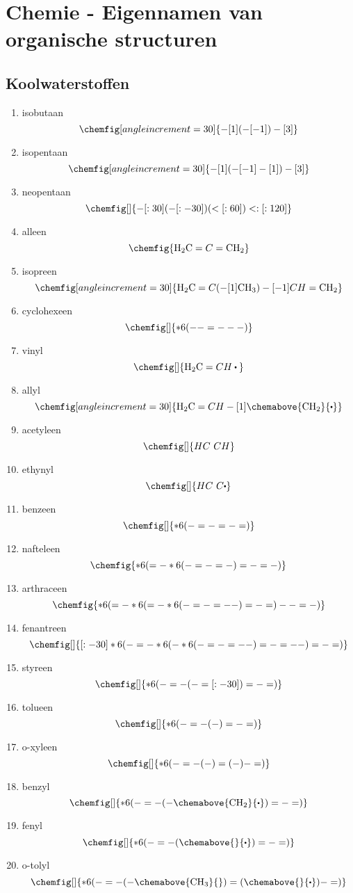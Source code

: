 \documentclass[a4paper,12pt]{article}
\begin{document}
    \maketitle

    \section{Chemie - Eigennamen van organische structuren}

    \subsection{Koolwaterstoffen}
    \begin{enumerate}
        \item isobutaan $$\chemfig[angle increment=30]{-[1](-[-1])-[3]}$$
        \item isopentaan $$\chemfig[angle increment=30]{-[1](-[-1]-[1])-[3]}$$
        \item neopentaan $$\chemfig[]{-[:30](-[:-30])(<[:60])<:[:120]}$$
        \item alleen $$\chemfig{\ce{H2C}=C=\ce{CH2}}$$
        \item isopreen $$\chemfig[angle increment=30]{\ce{H2C}=C(-[1]\ce{CH3})-[-1]CH=\ce{CH2}}$$
        \item cyclohexeen $$\chemfig[]{*6(--=---)}$$
        \item vinyl $$\chemfig[]{\ce{H2C}=CH\bigcdot{}}$$
        \item allyl $$\chemfig[angle increment=30]{\ce{H2C}=CH-[1]\chemabove{\ce{CH2}}{\bigcdot}}$$
        \item acetyleen $$\chemfig[]{HC~CH}$$
        \item ethynyl $$\chemfig[]{HC~C\bigcdot}$$
        \item benzeen $$\chemfig[]{*6(-=-=-=)}$$
        \item nafteleen $$\chemfig{*6(=-*6(-=-=-)=-=-)}$$
        \item arthraceen $$\chemfig{*6(=-*6(=-*6(-=-=--)=-=)--=-)}$$
        \item fenantreen $$\chemfig[]{[:-30]*6(-=-*6(-*6(-=-=--)=-=--)=-=)}$$
        \item styreen $$\chemfig[]{*6(-=-(-=[:-30])=-=)}$$
        \item tolueen $$\chemfig[]{*6(-=-(-)=-=)}$$
        \item o-xyleen $$\chemfig[]{*6(-=-(-)=(-)-=)}$$
        \item benzyl $$\chemfig[]{*6(-=-(-\chemabove{\ce{CH2}}{\bigcdot{}})=-=)}$$
        \item fenyl $$\chemfig[]{*6(-=-(\chemabove{}{\bigcdot{}})=-=)}$$
        \item o-tolyl $$\chemfig[]{*6(-=-(-\chemabove{\ce{CH3}}{})=(\chemabove{}{\bigcdot{}})-=)}$$
    \end{enumerate}
\end{document}
